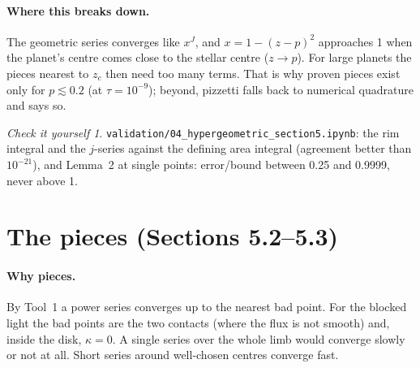 \documentclass[11pt,a4paper]{article}
\theoremstyle{remark}
\newtheorem*{checkit}{Check it yourself}
\newcommand{\nb}[1]{\texttt{validation/#1}}
\begin{document}
\paragraph{Where this breaks down.} The geometric series converges like $x^J$, and
$x=1-(z-p)^2$ approaches 1 when the planet's centre comes close to the stellar centre ($z\to p$).
For large planets the pieces nearest to $z_c$ then need too many terms. That is why proven pieces
exist only for $p\lesssim0.2$ (at $\tau=10^{-9}$); beyond, pizzetti falls back to numerical
quadrature and says so.

\begin{checkit}
\nb{04\_hypergeometric\_section5.ipynb}: the rim integral and the $j$-series against the defining
area integral (agreement better than $10^{-21}$), and Lemma~2 at single points: error/bound between
0.25 and 0.9999, never above 1.
\end{checkit}

\section{The pieces (Sections 5.2--5.3)}

\paragraph{Why pieces.} By Tool~1 a power series converges up to the nearest bad point. For the
blocked light the bad points are the two contacts (where the flux is not smooth) and, inside the
disk, $\kappa=0$. A single series over the whole limb would converge slowly or not at all. Short
series around well-chosen centres converge fast.
\end{document}
